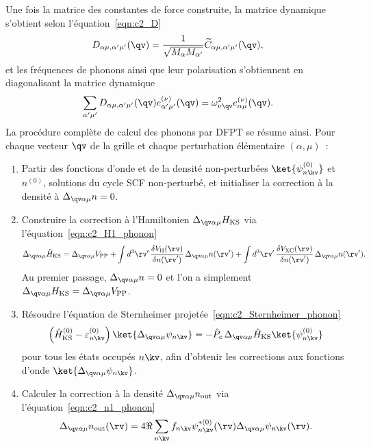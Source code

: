 Une fois la matrice des constantes de force construite, la matrice dynamique s'obtient selon l'équation~\eqref{eqn:c2_D}
\begin{equation}
    D_{\alpha\mu,\alpha'\mu'}(\qv)=\frac{1}{\sqrt{M_\alpha M_{\alpha'}}}\widetilde{C}_{\alpha\mu,\alpha'\mu'}(\qv),
\end{equation}
et les fréquences de phonons ainsi que leur polarisation s'obtiennent en diagonalisant la matrice dynamique
\begin{equation}
    \sum_{\alpha'\mu'}D_{\alpha\mu,\alpha'\mu'}(\qv)e_{\alpha'\mu'}^{(\nu)}(\qv)=\omega^2_{\nu\qv}e_{\alpha\mu}^{(\nu)}(\qv).
\end{equation}
La procédure complète de calcul des phonons par DFPT se résume 
ainsi. Pour chaque vecteur $\qv$ de la grille et chaque perturbation 
élémentaire $(\alpha,\mu)$~:
\begin{enumerate}
    \item Partir des fonctions d'onde et de la densité non-perturbées 
    $\ket{\psi_{n\kv}^{(0)}}$ et $n^{(0)}$, solutions du cycle SCF 
    non-perturbé, et initialiser la correction à la densité à 
    $\Delta_{\qv\alpha\mu}n=0$.

    \item Construire la correction à l'Hamiltonien 
    $\Delta_{\qv\alpha\mu}H_\text{KS}$ via 
    l'équation~\eqref{eqn:c2_H1_phonon}
    \[\Delta_{\qv\alpha\mu}\hat{H}_\text{KS} = 
    \Delta_{\qv\alpha\mu}V_\text{PP}
    +\int d^3\rv'\,
    \frac{\delta V_\text{H}(\rv)}{\delta n(\rv')}
    \,\Delta_{\qv\alpha\mu}n(\rv')
    +\int d^3\rv'\,
    \frac{\delta V_\text{XC}(\rv)}{\delta n(\rv')}
    \,\Delta_{\qv\alpha\mu}n(\rv').\]
    Au premier passage, $\Delta_{\qv\alpha\mu}n=0$ et l'on a 
    simplement $\Delta_{\qv\alpha\mu}H_\text{KS}=
    \Delta_{\qv\alpha\mu}V_\text{PP}$.

    \item Résoudre l'équation de Sternheimer 
    projetée~\eqref{eqn:c2_Sternheimer_phonon}
    \[\left(\hat{H}^{(0)}_\text{KS}-\varepsilon_{n\kv}^{(0)}\right)
    \ket{\Delta_{\qv\alpha\mu}\psi_{n\kv}}=
    -\hat{P}_c\,\Delta_{\qv\alpha\mu}\hat{H}_\text{KS}
    \ket{\psi_{n\kv}^{(0)}}\]
    pour tous les états occupés $n\kv$, afin d'obtenir les 
    corrections aux fonctions d'onde 
    $\ket{\Delta_{\qv\alpha\mu}\psi_{n\kv}}$.

    \item Calculer la correction à la densité 
    $\Delta_{\qv\alpha\mu}n_\text{out}$ via 
    l'équation~\eqref{eqn:c2_n1_phonon}
    \[\Delta_{\qv\alpha\mu}n_\text{out}(\rv)=
    4\Re\sum_{n\kv}f_{n\kv}
    \psi^{*(0)}_{n\kv}(\rv)
    \Delta_{\qv\alpha\mu}\psi_{n\kv}(\rv).\]


\end{enumerate}
